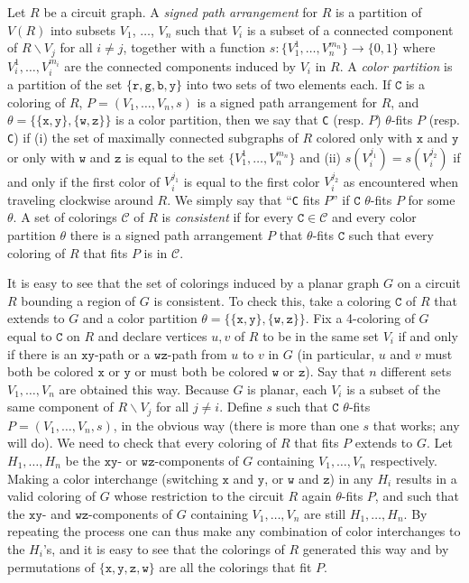 \documentclass[11pt]{article}
\newcommand{\mcal}{\mathcal}
\newcommand{\back}{\backslash}
\newcommand{\cR}{\texttt{r}}
\newcommand{\cG}{\texttt{g}}
\newcommand{\cB}{\texttt{b}}
\newcommand{\cY}{\texttt{y}}
\newcommand{\rC}{\texttt{C}}
\newcommand{\rX}{\texttt{x}}
\newcommand{\rY}{\texttt{y}}
\newcommand{\rZ}{\texttt{z}}
\newcommand{\rW}{\texttt{w}}
\begin{document}
Let $R$ be a circuit graph. A \emph{signed path arrangement} for $R$ is a partition of $V(R)$ into subsets $V_1$, $\ldots$, $V_n$ such that $V_i$ is a subset of a connected component of $R\back V_j$ for all $i \ne j$, 
together with a function $s: \{ V_1^1, \dots, V_{n}^{m_n}\} \rightarrow \{ 0, 1\}$ 
where $V_i^1, \dots, V_{i}^{m_i}$ 
are the connected components induced by $V_i$ in $R$. A \emph{color partition} is a partition of the set $\{\cR, \cG, \cB, \cY\}$ into two sets of two elements each. If $\rC$ is a coloring of $R$, $P = (V_1, \ldots, V_n, s)$ is a signed path arrangement for $R$, and $\theta = \{ \{ \rX, \rY \}, \{ \rW, \rZ \} \}$ is a color partition, then we say that 
\rC{} (resp$.$ $P$) $\theta$-fits $P$ (resp. \rC) 
if (i) the set of maximally connected subgraphs of $R$ colored only with $\rX$ and $\rY$ or only with $\rW$ and $\rZ$ is equal to the set 
$\{ V_1^1, \dots, V_{n}^{m_n}\}$ and (ii) $s(V_{i}^{j_1}) = s(V_{i}^{j_2})$ if and only if the first color of $V_{i}^{j_1}$ is equal to the first color $V_{i}^{j_2}$ as encountered when traveling clockwise around $R$. We simply say that ``\rC{} fits $P$'' if $\rC$ $\theta$-fits $P$ for some $\theta$. A set of colorings $\mcal{C}$ of $R$ is \emph{consistent} if for every $\rC \in \mcal{C}$ and every color partition $\theta$ there is a signed path arrangement $P$ that $\theta$-fits $\rC$ such that every coloring of $R$ that fits $P$ is in $\mcal{C}$.

It is easy to see that the set of colorings induced by a planar graph $G$ on a circuit $R$ bounding a region of $G$ is consistent. 
To check this, take a coloring $\rC$ of $R$ that extends to $G$ and a color partition $\theta = \{ \{ \rX, \rY \}, \{ \rW, \rZ \} \}$. 
Fix a 4-coloring of $G$ equal to $\rC$ on $R$ and declare vertices $u, v$ of $R$ to be in the same set $V_i$ if and only if there is an $\rX\rY$-path or a $\rW\rZ$-path from $u$ to $v$ in $G$ 
(in particular, $u$ and $v$ must both be colored $\rX$ or $\rY$ or must both be colored $\rW$ or $\rZ$).
Say that $n$ different sets $V_1, \ldots, V_n$ are obtained this way. 
Because $G$ is planar, each $V_i$ is a subset of the same component of $R\back V_j$ for all $j \ne i$.
Define $s$ such that $\rC$ $\theta$-fits $P = (V_1, \ldots, V_n, s)$, in the obvious way (there is more than one $s$ that works; any will do). 
We need to check that every coloring of $R$ that fits $P$ extends to $G$. Let $H_1, \ldots, H_n$ be the $\rX\rY$- or $\rW\rZ$-components of $G$ containing $V_1, \ldots, V_n$ respectively. Making a color interchange (switching $\rX$ and $\rY$, or $\rW$ and $\rZ$) in any $H_i$ results in a valid coloring of $G$ whose restriction to the circuit $R$ again $\theta$-fits $P$, and such that the $\rX\rY$- and $\rW\rZ$-components of $G$ containing $V_1, \ldots, V_n$ are still $H_1, \ldots, H_n$. By repeating the process one can thus make any combination of color interchanges to the $H_i$'s, and it is easy to see that the colorings of $R$ generated this way and by permutations of $\{ \rX, \rY, \rZ, \rW \}$ are all the colorings that fit $P$.
\end{document}
